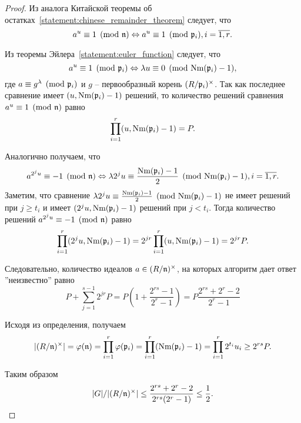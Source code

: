 \documentclass[_00_dissertation.tex]{subfiles}
\begin{document}
\begin{proof}
    Из аналога Китайской теоремы об остатках~\ref{statement:chinese_remainder_theorem} следует, что
    \begin{equation*}
        a^u \equiv 1 \pmod{\mathfrak{n}}
        \Leftrightarrow
        a^u \equiv 1 \pmod{\mathfrak{p}_i}, i=\overline{1, r}.
    \end{equation*}

    Из теоремы Эйлера~\ref{statement:euler_function} следует, что
    \begin{equation*}
        a^u \equiv 1 \pmod{\mathfrak{p}_i}
        \Leftrightarrow
        \lambda u \equiv 0 \pmod{\textrm{Nm}(\mathfrak{p}_i) - 1},
    \end{equation*}
    где $a \equiv g^\lambda \pmod{\mathfrak{p}_i}$ и $g$ -- первообразный корень $(R/\mathfrak{p}_i)^{\times}$.
    Так как последнее сравнение имеет $(u, \textrm{Nm}(\mathfrak{p}_i) - 1)$ решений, то количество решений сравнения $a^u \equiv 1 \pmod{\mathfrak{n}}$ равно
    \begin{equation*}
        \prod_{i=1}^r (u, \textrm{Nm}(\mathfrak{p}_i) - 1) = P.
    \end{equation*}

    Аналогично получаем, что
    \begin{equation*}
        a^{2^j u} \equiv -1 \pmod{\mathfrak{n}}
        \Leftrightarrow
        \lambda 2^j u \equiv \frac{\textrm{Nm}(\mathfrak{p}_i) - 1}{2} \pmod{\textrm{Nm}(\mathfrak{p}_i) - 1}, i=\overline{1, r}.
    \end{equation*}
    Заметим, что сравнение $\lambda 2^j u \equiv \frac{\textrm{Nm}(\mathfrak{p}_i) - 1}{2} \pmod{\textrm{Nm}(\mathfrak{p}_i) - 1}$ не имеет решений при $j \ge t_i$ и имеет $(2^j u, \textrm{Nm}(\mathfrak{p}_i) - 1)$ решений при $j < t_i$.
    Тогда количество решений $a^{2^j u} \equiv -1 \pmod{\mathfrak{n}}$ равно
    \begin{equation*}
        \prod_{i=1}^r (2^j u, \textrm{Nm}(\mathfrak{p}_i) - 1) = 2^{jr} \prod_{i=1}^r (u, \textrm{Nm}(\mathfrak{p}_i) - 1) = 2^{jr} P.
    \end{equation*}

    Следовательно, количество идеалов $a \in (R/\mathfrak{n})^{\times}$, на которых алгоритм дает ответ ''неизвестно'' равно
    \begin{equation*}
        P + \sum_{j=1}^{s-1} 2^{jr} P = P\left(1 + \frac{2^{rs} - 1}{2^r - 1}\right) = P\frac{2^{rs} + 2^r - 2}{2^r - 1}
    \end{equation*}

    Исходя из определения, получаем
    \begin{equation*}
        |(R/\mathfrak{n})^{\times}| = \varphi(\mathfrak{n}) = \prod_{i=1}^r \varphi(\mathfrak{p}_i) = \prod_{i=1}^r (\textrm{Nm}(\mathfrak{p}_i) - 1) = \prod_{i=1}^r 2^{t_i} u_i \ge 2^{rs} P.
    \end{equation*}

    Таким образом
    \begin{equation*}
        |G|/|(R/\mathfrak{n})^{\times}| \le \frac{2^{rs} + 2^r - 2}{2^{rs}(2^r - 1)} \le \frac{1}{2}.
    \end{equation*}
\end{proof}
\end{document}
